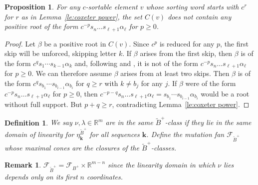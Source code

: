 \documentclass{amsart}
\newtheorem{definition}[theorem]{Definition}
\newtheorem{proposition}[theorem]{Proposition}
\newtheorem{remark}[theorem]{Remark}
\numberwithin{theorem}{section}
\newcommand{\bfk}{{\boldsymbol{k}}}
\newcommand{\cF}{\mathcal{F}}
\newcommand{\RR}{\mathbb{R}}
\begin{document}
  \begin{proposition}
    For any $c$-sortable element $v$ whose sorting word starts with $c^r$ for $r$ as in Lemma~\ref{le:coxeter power}, the set $C(v)$ does not contain any positive root of the form $c^{-p} s_n \ldots s_{\ell+1} \alpha_\ell$ for $p\ge0$.  
  \end{proposition}
  \begin{proof}
    Let $\beta$ be a positive root in $C(v)$.
    Since $c^p$ is reduced for any $p$, the first skip will be unforced, skipping letter $k$.
    If $\beta$ arises from the first skip, then $\beta$ is of the form $c^q s_1 \cdots s_{k-1} \alpha_k$ and, following \cite[Theorem 1.2(1)]{Reading-Stella} and \cite[Section 1]{Dlab-Ringel}, it is not of the form $c^{-p} s_n \ldots s_{\ell+1} \alpha_\ell$ for $p\ge0$. 
    We can therefore assume $\beta$ arises from at least two skips.
    Then $\beta$ is of the form $c^q s_{b_1} \cdots s_{b_{i-1}} \alpha_{b_i}$ for $q\ge r$ with $k\ne b_j$ for any $j$.
    If $\beta$ were of the form $c^{-p} s_n \ldots s_{\ell+1} \alpha_\ell$ for $p\ge0$, then $c^{-p-q} s_n \ldots s_{\ell+1} \alpha_\ell=s_{b_1} \cdots s_{b_{i-1}} \alpha_{b_i}$ would be a root without full support.
    But $p+q\ge r$, contradicting Lemma~\ref{le:coxeter power}.
  \end{proof}
  
  







  \begin{definition}
    We say $\nu,\lambda\in\RR^m$ are in the same \emph{$\widetilde B^+$-class} if they lie in the same domain of linearity for $\eta^{\widetilde B^+}_\bfk$ for all sequences $\bfk$.
    Define the \emph{mutation fan} $\cF_{\widetilde B^+}$ whose maximal cones are the closures of the $\widetilde B^+$-classes.
  \end{definition}
  \begin{remark}
    $\cF_{\widetilde B^+}=\cF_{B^+}\times \RR^{m-n}$ since the linearity domain in which $\nu$ lies depends only on its first $n$ coordinates.
  \end{remark}
\end{document}
